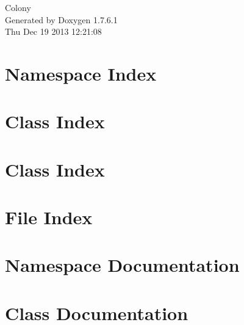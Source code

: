 \documentclass[a4paper]{book}
\begin{document}
\hypersetup{pageanchor=false,citecolor=blue}
\begin{titlepage}
\vspace*{7cm}
\begin{center}
{\Large \-Colony }\\
\vspace*{1cm}
{\large \-Generated by Doxygen 1.7.6.1}\\
\vspace*{0.5cm}
{\small Thu Dec 19 2013 12:21:08}\\
\end{center}
\end{titlepage}
\clearemptydoublepage
{}
\tableofcontents
\clearemptydoublepage
{}
\hypersetup{pageanchor=true,citecolor=blue}
\chapter{\-Namespace \-Index}

\chapter{\-Class \-Index}

\chapter{\-Class \-Index}

\chapter{\-File \-Index}

\chapter{\-Namespace \-Documentation}


\chapter{\-Class \-Documentation}
































\end{document}
